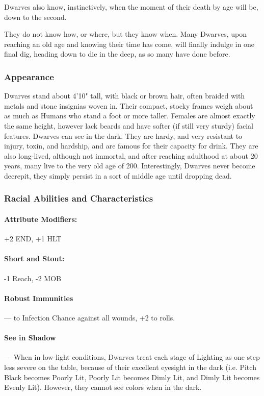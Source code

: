\documentclass[oneside,11pt,english]{book}
\begin{document}
 
Dwarves also know, instinctively, when the moment of their death by age will be, down to the second. 


They do not know how, or where, but they know when. Many Dwarves, upon reaching an old age and 
knowing their time has come, will finally indulge in one final dig, heading down to die in the deep, as so 
many have done before. 
\subsubsection*{Appearance} 
Dwarves stand about 4'10" tall, with black or brown hair, often braided with metals and stone insignias 
woven in. Their compact, stocky frames weigh about as much as Humans who stand a foot or more taller. 
Females are almost exactly the same height, however lack beards and have softer (if still very sturdy) 
facial features. Dwarves can see in the dark. They are hardy, and very resistant to injury, toxin, and 
hardship, and are famous for their capacity for drink. They are also long-lived, although not immortal, and 
after reaching adulthood at about 20 years, many live to the very old age of 200. Interestingly, Dwarves 
never become decrepit, they simply persist in a sort of middle age until dropping dead. 
\subsubsection*{Racial Abilities and Characteristics} 
\paragraph{Attribute Modifiers:} +2 END, +1 HLT 
\paragraph{Short and Stout:}
-1 Reach, -2 MOB 
\paragraph{Robust Immunities}--- to Infection Chance against all wounds, +2 to  rolls. 
\paragraph{See in Shadow}\label{par:Dwarf - See in Shadow}
---\quad
When in low-light conditions, Dwarves treat each stage of Lighting as one step less severe on the 
table, because of their excellent eyesight in the dark (i.e. Pitch Black becomes Poorly Lit, Poorly 
Lit becomes Dimly Lit, and Dimly Lit becomes Evenly Lit). However, they cannot see colors 
when in the dark. 
\end{document}
